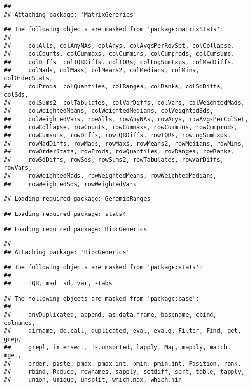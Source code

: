 \documentclass[
  oneside]{book}
\begin{document}
\begin{verbatim}
## 
## Attaching package: 'MatrixGenerics'
\end{verbatim}

\begin{verbatim}
## The following objects are masked from 'package:matrixStats':
## 
##     colAlls, colAnyNAs, colAnys, colAvgsPerRowSet, colCollapse,
##     colCounts, colCummaxs, colCummins, colCumprods, colCumsums,
##     colDiffs, colIQRDiffs, colIQRs, colLogSumExps, colMadDiffs,
##     colMads, colMaxs, colMeans2, colMedians, colMins, colOrderStats,
##     colProds, colQuantiles, colRanges, colRanks, colSdDiffs, colSds,
##     colSums2, colTabulates, colVarDiffs, colVars, colWeightedMads,
##     colWeightedMeans, colWeightedMedians, colWeightedSds,
##     colWeightedVars, rowAlls, rowAnyNAs, rowAnys, rowAvgsPerColSet,
##     rowCollapse, rowCounts, rowCummaxs, rowCummins, rowCumprods,
##     rowCumsums, rowDiffs, rowIQRDiffs, rowIQRs, rowLogSumExps,
##     rowMadDiffs, rowMads, rowMaxs, rowMeans2, rowMedians, rowMins,
##     rowOrderStats, rowProds, rowQuantiles, rowRanges, rowRanks,
##     rowSdDiffs, rowSds, rowSums2, rowTabulates, rowVarDiffs, rowVars,
##     rowWeightedMads, rowWeightedMeans, rowWeightedMedians,
##     rowWeightedSds, rowWeightedVars
\end{verbatim}

\begin{verbatim}
## Loading required package: GenomicRanges
\end{verbatim}

\begin{verbatim}
## Loading required package: stats4
\end{verbatim}

\begin{verbatim}
## Loading required package: BiocGenerics
\end{verbatim}

\begin{verbatim}
## 
## Attaching package: 'BiocGenerics'
\end{verbatim}

\begin{verbatim}
## The following objects are masked from 'package:stats':
## 
##     IQR, mad, sd, var, xtabs
\end{verbatim}

\begin{verbatim}
## The following objects are masked from 'package:base':
## 
##     anyDuplicated, append, as.data.frame, basename, cbind, colnames,
##     dirname, do.call, duplicated, eval, evalq, Filter, Find, get, grep,
##     grepl, intersect, is.unsorted, lapply, Map, mapply, match, mget,
##     order, paste, pmax, pmax.int, pmin, pmin.int, Position, rank,
##     rbind, Reduce, rownames, sapply, setdiff, sort, table, tapply,
##     union, unique, unsplit, which.max, which.min
\end{verbatim}
\end{document}
